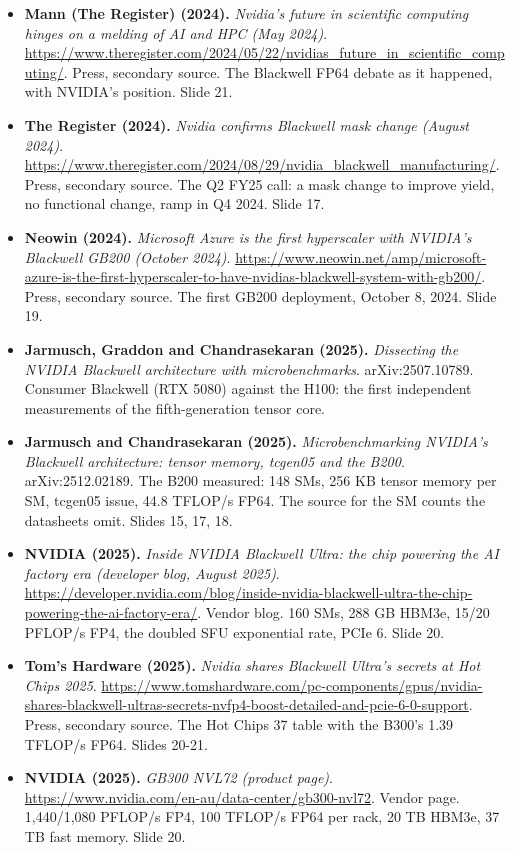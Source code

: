 \begin{itemize}[leftmargin=1.2em,itemsep=3pt]
\item \textbf{Mann (The Register) (2024).} \textit{Nvidia's future in scientific computing hinges on a melding of AI and HPC (May 2024)}. \url{https://www.theregister.com/2024/05/22/nvidias_future_in_scientific_computing/}. Press, secondary source. The Blackwell FP64 debate as it happened, with NVIDIA's position. Slide 21.
\item \textbf{The Register (2024).} \textit{Nvidia confirms Blackwell mask change (August 2024)}. \url{https://www.theregister.com/2024/08/29/nvidia_blackwell_manufacturing/}. Press, secondary source. The Q2 FY25 call: a mask change to improve yield, no functional change, ramp in Q4 2024. Slide 17.
\item \textbf{Neowin (2024).} \textit{Microsoft Azure is the first hyperscaler with NVIDIA's Blackwell GB200 (October 2024)}. \url{https://www.neowin.net/amp/microsoft-azure-is-the-first-hyperscaler-to-have-nvidias-blackwell-system-with-gb200/}. Press, secondary source. The first GB200 deployment, October 8, 2024. Slide 19.
\item \textbf{Jarmusch, Graddon and Chandrasekaran (2025).} \textit{Dissecting the NVIDIA Blackwell architecture with microbenchmarks}. arXiv:2507.10789. Consumer Blackwell (RTX 5080) against the H100: the first independent measurements of the fifth-generation tensor core.
\item \textbf{Jarmusch and Chandrasekaran (2025).} \textit{Microbenchmarking NVIDIA's Blackwell architecture: tensor memory, tcgen05 and the B200}. arXiv:2512.02189. The B200 measured: 148 SMs, 256 KB tensor memory per SM, tcgen05 issue, 44.8 TFLOP/s FP64. The source for the SM counts the datasheets omit. Slides 15, 17, 18.
\item \textbf{NVIDIA (2025).} \textit{Inside NVIDIA Blackwell Ultra: the chip powering the AI factory era (developer blog, August 2025)}. \url{https://developer.nvidia.com/blog/inside-nvidia-blackwell-ultra-the-chip-powering-the-ai-factory-era/}. Vendor blog. 160 SMs, 288 GB HBM3e, 15/20 PFLOP/s FP4, the doubled SFU exponential rate, PCIe 6. Slide 20.
\item \textbf{Tom's Hardware (2025).} \textit{Nvidia shares Blackwell Ultra's secrets at Hot Chips 2025}. \url{https://www.tomshardware.com/pc-components/gpus/nvidia-shares-blackwell-ultras-secrets-nvfp4-boost-detailed-and-pcie-6-0-support}. Press, secondary source. The Hot Chips 37 table with the B300's 1.39 TFLOP/s FP64. Slides 20-21.
\item \textbf{NVIDIA (2025).} \textit{GB300 NVL72 (product page)}. \url{https://www.nvidia.com/en-au/data-center/gb300-nvl72}. Vendor page. 1,440/1,080 PFLOP/s FP4, 100 TFLOP/s FP64 per rack, 20 TB HBM3e, 37 TB fast memory. Slide 20.

\end{itemize}
